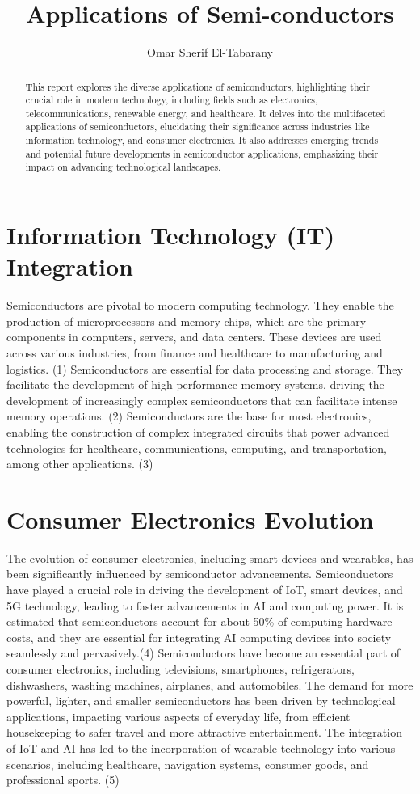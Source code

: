 \documentclass[12pt]{article}
\title{Applications of Semi-conductors}
\author{Omar Sherif El-Tabarany}
\date{}
\begin{document}
	
	\maketitle
	
	\begin{abstract}
		This report explores the diverse applications of semiconductors, highlighting their crucial role in modern technology, including fields such as electronics, telecommunications, renewable energy, and healthcare. It delves into the multifaceted applications of semiconductors, elucidating their significance across industries like information technology, and consumer electronics. It also addresses emerging trends and potential future developments in semiconductor applications, emphasizing their impact on advancing technological landscapes.
	\end{abstract}	
		
	\tableofcontents
	
	\section{Information Technology (IT) Integration}
	Semiconductors are pivotal to modern computing technology. They enable the production of microprocessors and memory chips, which are the primary components in computers, servers, and data centers. These devices are used across various industries, from finance and healthcare to manufacturing and logistics. (1) Semiconductors are essential for data processing and storage. They facilitate the development of high-performance memory systems, driving the development of increasingly complex semiconductors that can facilitate intense memory operations. (2) Semiconductors are the base for most electronics, enabling the construction of complex integrated circuits that power advanced technologies for healthcare, communications, computing, and transportation, among other applications. (3)
	
	\section{Consumer Electronics Evolution}
	The evolution of consumer electronics, including smart devices and wearables, has been significantly influenced by semiconductor advancements. Semiconductors have played a crucial role in driving the development of IoT, smart devices, and 5G technology, leading to faster advancements in AI and computing power. It is estimated that semiconductors account for about 50\% of computing hardware costs, and they are essential for integrating AI computing devices into society seamlessly and pervasively.(4) Semiconductors have become an essential part of consumer electronics, including televisions, smartphones, refrigerators, dishwashers, washing machines, airplanes, and automobiles. The demand for more powerful, lighter, and smaller semiconductors has been driven by technological applications, impacting various aspects of everyday life, from efficient housekeeping to safer travel and more attractive entertainment. The integration of IoT and AI has led to the incorporation of wearable technology into various scenarios, including healthcare, navigation systems, consumer goods, and professional sports. (5)
	
\end{document}
